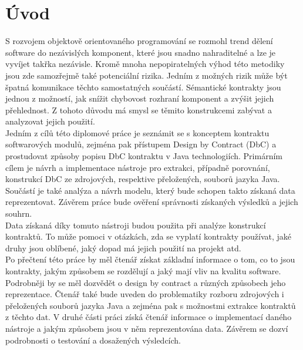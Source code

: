 \chapter{Úvod}

S rozvojem objektově orientovaného programování se rozmohl trend dělení software do nezávislých komponent, které jsou snadno nahraditelné a lze je vyvíjet takřka nezávisle. Kromě mnoha nepopiratelných výhod této metodiky jsou zde samozřejmě také potenciální rizika. Jedním z možných rizik může být špatná komunikace těchto samostatných součástí. Sémantické kontrakty jsou jednou z možností, jak snížit chybovost rozhraní komponent a zvýšit jejich přehlednost. Z tohoto důvodu má smysl se těmito konstrukcemi zabývat a analyzovat jejich použití.\\

Jedním z cílů této diplomové práce je seznámit se s konceptem kontraktu softwarových modulů, zejména pak přístupem Design by Contract (DbC) a prostudovat způsoby popisu DbC kontraktu v Java technologiích. Primárním cílem je návrh a implementace nástroje pro extrakci, případně porovnání, konstrukcí DbC ze zdrojových, respektive přeložených, souborů jazyka Java. Součástí je také analýza a návrh modelu, který bude schopen takto získaná data reprezentovat. Závěrem práce bude ověření správnosti získaných výsledků a jejich souhrn.\\ 

Data získaná díky tomuto nástroji budou použita při analýze konstrukcí kontraktů. To může pomoci v otázkách, zda se vyplatí kontrakty používat, jaké druhy jsou oblíbené, jaký dopad má jejich použití na projekt atd.\\

Po přečtení této práce by měl čtenář získat základní informace o tom, co to jsou kontrakty, jakým způsobem se rozdělují a jaký mají vliv na kvalitu software. Podrobněji by se měl dozvědět o design by contract a různých způsobech jeho reprezentace. Čtenář také bude uveden do problematiky rozboru zdrojových i přeložených souborů jazyka Java a zejména pak s možnostmi extrakce kontraktů z těchto dat. V druhé části práci získá čtenář informace o implementací daného nástroje a jakým způsobem jsou v něm reprezentována data. Závěrem se dozví podrobnosti o testování a dosažených výsledcích.